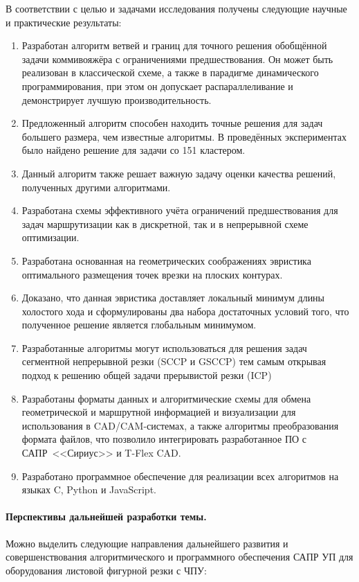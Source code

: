 В соответствии с целью и задачами исследования получены следующие
научные и практические результаты:

\begin{enumerate}
  \item
  Разработан алгоритм ветвей и границ для точного решения
  обобщённой задачи коммивояжёра с ограничениями предшествования.
  Он может быть реализован в классической схеме,
  а также в парадигме динамического программирования,
  при этом он допускает
  распараллеливание и демонстрирует лучшую производительность.
  \item
  Предложенный алгоритм способен находить точные решения для задач большего размера,
  чем известные алгоритмы.
  В проведённых экспериментах было найдено решение для
  задачи со 151 кластером.
  \item
  Данный алгоритм также решает важную задачу оценки качества
  решений, полученных другими алгоритмами.
  \item
  Разработана схемы эффективного учёта ограничений предшествования
  для задач маршрутизации как в дискретной,
  так и в непрерывной схеме оптимизации.
  \item
  Разработана основанная на геометрических соображениях эвристика
  оптимального размещения точек врезки на плоских контурах.
  \item
  Доказано, что данная эвристика доставляет локальный минимум длины холостого хода
  и сформулированы два набора достаточных условий того,
  что полученное решение является глобальным минимумом.
  \item
  Разработанные алгоритмы могут использоваться для
  решения задач сегментной непрерывной резки (SCCP и GSCCP)
  тем самым открывая подход к решению общей задачи прерывистой резки
  (ICP)
  \item
  Разработаны форматы данных
  и алгоритмические схемы
  для обмена геометрической и маршрутной
  информацией и визуализации для использования в CAD/CAM-системах,
  а также алгоритмы преобразования формата файлов,
  что позволило интегрировать разработанное ПО
  с САПР~<<Сириус>>
  и T-Flex CAD.
  \item
  Разработано программное обеспечение для реализации всех алгоритмов
  на языках C, Python и JavaScript.
\end{enumerate}

\paragraph*{Перспективы дальнейшей разработки темы.}
Можно выделить следующие направления дальнейшего развития и совершенствования алгоритмического и
программного обеспечения САПР УП для оборудования листовой фигурной резки с ЧПУ:

